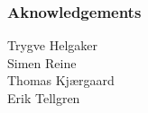 \documentclass[12pt,a4paper,english]{beamer}
\begin{document}
%
%
%
%

\begin{frame}
        \frametitle{Aknowledgements}

        Trygve Helgaker\\
        Simen Reine\\
        Thomas Kj\ae rgaard\\
        Erik Tellgren\\

        
\end{frame}
\end{document}
